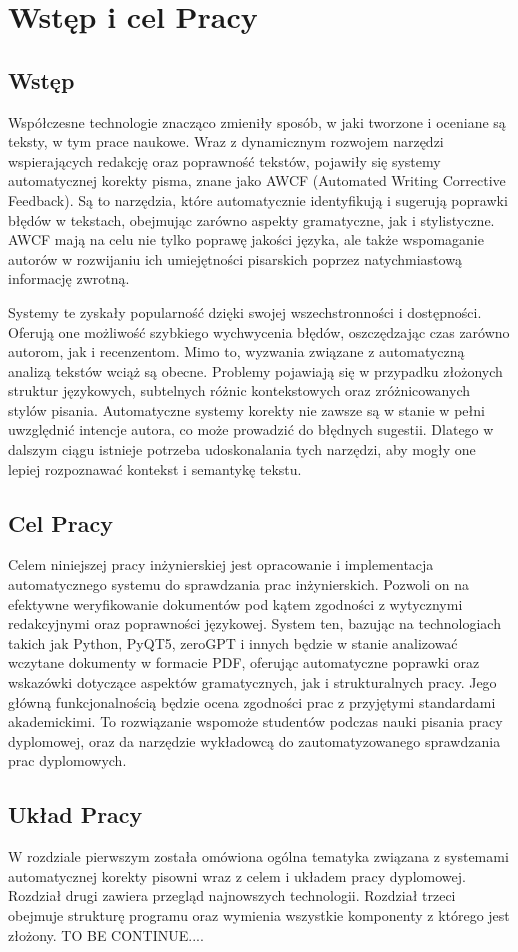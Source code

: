 \chapter{Wstęp i cel Pracy}

\section{Wstęp}
\noindent Współczesne technologie znacząco zmieniły sposób, w jaki tworzone i oceniane są teksty, w tym prace naukowe. Wraz z dynamicznym rozwojem narzędzi wspierających redakcję oraz poprawność tekstów, pojawiły się systemy automatycznej korekty pisma, znane jako AWCF (Automated Writing Corrective Feedback). Są to narzędzia, które automatycznie identyfikują i sugerują poprawki błędów w tekstach, obejmując zarówno aspekty gramatyczne, jak i stylistyczne. AWCF mają na celu nie tylko poprawę jakości języka, ale także wspomaganie autorów w rozwijaniu ich umiejętności pisarskich poprzez natychmiastową informację zwrotną.

Systemy te zyskały popularność dzięki swojej wszechstronności i dostępności. Oferują one możliwość szybkiego wychwycenia błędów, oszczędzając czas zarówno autorom, jak i recenzentom. Mimo to, wyzwania związane z automatyczną analizą tekstów wciąż są obecne. Problemy pojawiają się w przypadku złożonych struktur językowych, subtelnych różnic kontekstowych oraz zróżnicowanych stylów pisania. Automatyczne systemy korekty nie zawsze są w stanie w pełni uwzględnić intencje autora, co może prowadzić do błędnych sugestii. Dlatego w dalszym ciągu istnieje potrzeba udoskonalania tych narzędzi, aby mogły one lepiej rozpoznawać kontekst i semantykę tekstu.

\section{Cel Pracy}
Celem niniejszej pracy inżynierskiej jest opracowanie i implementacja automatycznego systemu do sprawdzania prac inżynierskich. Pozwoli on na efektywne weryfikowanie dokumentów pod kątem zgodności z wytycznymi redakcyjnymi oraz poprawności językowej. System ten, bazując na technologiach takich jak Python, PyQT5, zeroGPT i innych będzie w stanie analizować wczytane dokumenty w formacie PDF, oferując automatyczne poprawki oraz wskazówki dotyczące aspektów gramatycznych, jak i strukturalnych pracy. Jego główną funkcjonalnością będzie ocena zgodności prac z przyjętymi standardami akademickimi. To rozwiązanie wspomoże studentów podczas nauki pisania pracy dyplomowej, oraz da narzędzie wykładowcą do zautomatyzowanego sprawdzania prac dyplomowych.

\section{Układ Pracy}
W rozdziale pierwszym została omówiona ogólna tematyka związana z systemami automatycznej korekty pisowni wraz z celem i układem pracy dyplomowej. Rozdział drugi zawiera przegląd najnowszych technologii. Rozdział trzeci obejmuje strukturę programu oraz wymienia wszystkie komponenty z którego jest złożony. TO BE CONTINUE....